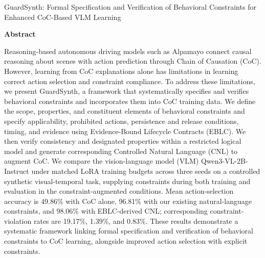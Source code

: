 \documentclass[11pt,a4paper]{article}
\begin{document}
\vspace*{8mm}
{\Large\bfseries\color{navy}\raggedright GuardSynth: Formal Specification and Verification of Behavioral Constraints for Enhanced CoC-Based VLM Learning\par}
\vspace{8mm}
{\large\bfseries Abstract\par}
\vspace{3mm}
Reasoning-based autonomous driving models such as Alpamayo connect causal reasoning about scenes with action prediction through Chain of Causation (CoC). However, learning from CoC explanations alone has limitations in learning correct action selection and constraint compliance. To address these limitations, we present GuardSynth, a framework that systematically specifies and verifies behavioral constraints and incorporates them into CoC training data. We define the scope, properties, and constituent elements of behavioral constraints and specify applicability, prohibited actions, persistence and release conditions, timing, and evidence using Evidence-Bound Lifecycle Contracts (EBLC). We then verify consistency and designated properties within a restricted logical model and generate corresponding Controlled Natural Language (CNL) to augment CoC. We compare the vision-language model (VLM) Qwen3-VL-2B-Instruct under matched LoRA training budgets across three seeds on a controlled synthetic visual-temporal task, supplying constraints during both training and evaluation in the constraint-augmented conditions. Mean action-selection accuracy is 49.86\% with CoC alone, 96.81\% with our existing natural-language constraints, and 98.06\% with EBLC-derived CNL; corresponding constraint-violation rates are 19.17\%, 1.39\%, and 0.83\%. These results demonstrate a systematic framework linking formal specification and verification of behavioral constraints to CoC learning, alongside improved action selection with explicit constraints.
\clearpage
\end{document}
